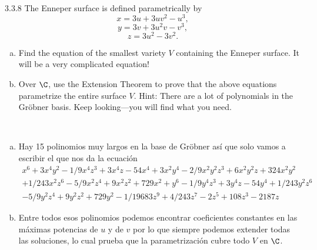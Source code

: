 \documentclass[twoside]{article}
\begin{document}
\begin{ejercicio}{3.3.8}
The Enneper surface is defined parametrically by
\[x = 3u + 3uv^2 − u^3,\]
\[y = 3v + 3u^2v − v^3,\]
\[z = 3u^2 − 3v^2.\]
\begin{enumerate}[a.]
\item Find the equation of the smallest variety $V$ containing the Enneper surface. It will be
a very complicated equation!
\item  Over $\C$, use the Extension Theorem to prove that the above equations parametrize
the entire surface $V$. Hint: There are a lot of polynomials in the Gröbner basis. Keep
looking—you will find what you need.
\end{enumerate}

\end{ejercicio}
\begin{solucion}\
\begin{enumerate}[a.]
\item Hay 15 polinomios muy largos en la base de Gröbner así que solo vamos a escribir el que nos da la ecuación
\begin{gather*}
x^6 + 3x^4y^2 - 1/9x^4z^3 + 3x^4z - 54x^4 + 3x^2y^4 - 2/9x^2y^2z^3 + 6x^2y^2z + 324x^2y^2\\
 + 1/243x^2z^6 - 5/9x^2z^4 + 9x^2z^2 +729x^2 + y^6 - 1/9y^4z^3 + 3y^4z - 54y^4 + 1/243y^2z^6\\ 
 - 5/9y^2z^4  + 9y^2z^2  + 729y^2 - 1/19683z^9 + 4/243z^7 - 2z^5 + 108z^3 - 2187z
\end{gather*}
\item Entre todos esos polinomios podemos encontrar coeficientes constantes en las máximas potencias de $u$ y de $v$ por lo que siempre podemos extender todas las soluciones, lo cual prueba que la parametrización cubre todo $V$ en $\C$. 
\end{enumerate}
\end{solucion}


\newpage
\end{document}
